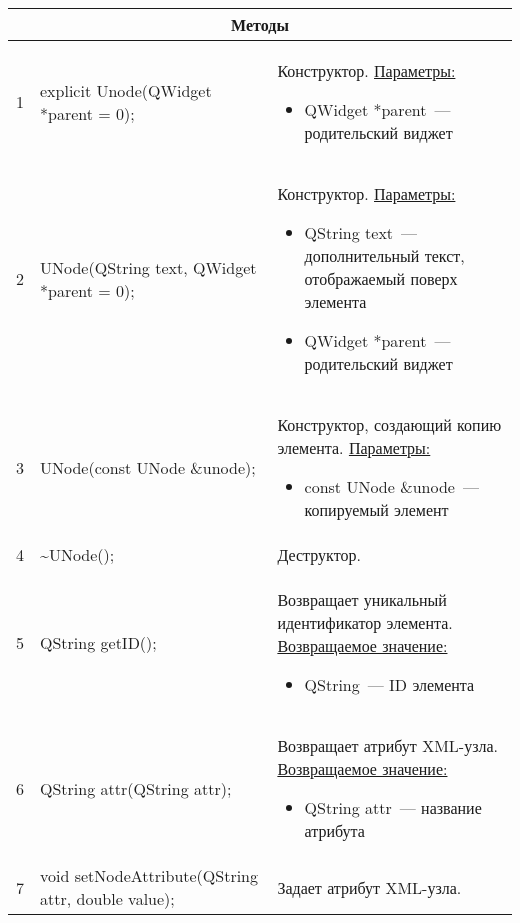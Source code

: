 \begin{longtable}[h]{|p{}|p{}|p{}|}
  \multicolumn{3}{|c|}{\textbf{Методы}} \\
  \hline
  1 & explicit Unode(QWidget *parent = 0); &
    Конструктор.\newline
    \uline{Параметры:}
    \begin{itemize}[nolistsep,label=,leftmargin=0cm]
      \item QWidget *parent~--- родительский виджет
    \end{itemize}\\ \hline
  2 & UNode(QString text, QWidget *parent = 0); &
    Конструктор.\newline
    \uline{Параметры:}
    \begin{itemize}[nolistsep,label=,leftmargin=0cm]
      \item QString text~--- дополнительный текст, отображаемый поверх элемента
      \item QWidget *parent~--- родительский виджет
    \end{itemize}\\ \hline
  3 & UNode(const UNode \&unode); &
    Конструктор, создающий копию элемента.\newline
    \uline{Параметры:}
    \begin{itemize}[nolistsep,label=,leftmargin=0cm]
      \item const UNode \&unode~--- копируемый элемент
    \end{itemize}\\ \hline
  4 & \textasciitilde UNode(); & Деструктор. \\ \hline
  5 & QString       getID(); & Возвращает уникальный идентификатор элемента.\newline
    \uline{Возвращаемое значение:}
    \begin{itemize}[nolistsep,label=,leftmargin=0cm]
      \item QString~--- ID элемента
    \end{itemize}\\ \hline
  6 & QString attr(QString attr); & Возвращает атрибут XML-узла.\newline
    \uline{Возвращаемое значение:}
    \begin{itemize}[nolistsep,label=,leftmargin=0cm]
      \item QString attr~--- название атрибута
    \end{itemize}\\ \hline
  7 & void setNodeAttribute(QString attr, double  value); & Задает атрибут XML-узла.\newline

\end{longtable}
